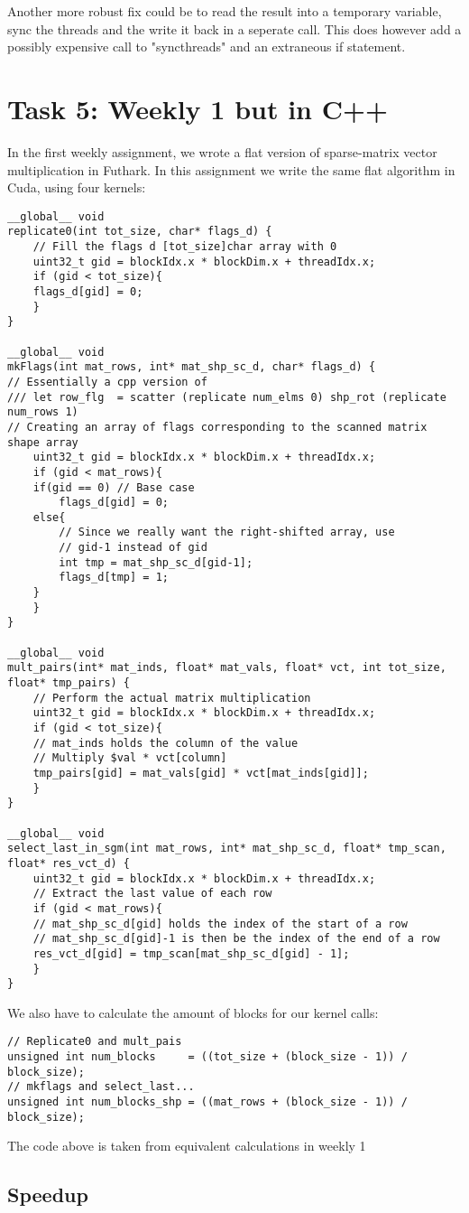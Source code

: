 \documentclass[11pt]{article}
\begin{document}
Another more robust fix could be to read the result into a temporary variable,
sync the threads and the write it back in a seperate call. This does
however add a possibly expensive call to "syncthreads" and an extraneous
if statement.

\section{Task 5: Weekly 1 but in C++}
\label{sec:org208e6fa}
In the first weekly assignment, we wrote a flat version of sparse-matrix
vector multiplication in Futhark. In this assignment we write the same
flat algorithm in Cuda, using four kernels: 
\begin{verbatim}
__global__ void
replicate0(int tot_size, char* flags_d) {
    // Fill the flags d [tot_size]char array with 0
    uint32_t gid = blockIdx.x * blockDim.x + threadIdx.x;
    if (gid < tot_size){
	flags_d[gid] = 0;
    }
}

__global__ void
mkFlags(int mat_rows, int* mat_shp_sc_d, char* flags_d) {
// Essentially a cpp version of
/// let row_flg  = scatter (replicate num_elms 0) shp_rot (replicate num_rows 1)
// Creating an array of flags corresponding to the scanned matrix shape array
    uint32_t gid = blockIdx.x * blockDim.x + threadIdx.x;
    if (gid < mat_rows){
	if(gid == 0) // Base case
	    flags_d[gid] = 0;
	else{
	    // Since we really want the right-shifted array, use 
	    // gid-1 instead of gid
	    int tmp = mat_shp_sc_d[gid-1];
	    flags_d[tmp] = 1;
	}
    }
}

__global__ void 
mult_pairs(int* mat_inds, float* mat_vals, float* vct, int tot_size, float* tmp_pairs) {
    // Perform the actual matrix multiplication
    uint32_t gid = blockIdx.x * blockDim.x + threadIdx.x;
    if (gid < tot_size){
	// mat_inds holds the column of the value
	// Multiply $val * vct[column]
	tmp_pairs[gid] = mat_vals[gid] * vct[mat_inds[gid]];
    }
}

__global__ void
select_last_in_sgm(int mat_rows, int* mat_shp_sc_d, float* tmp_scan, float* res_vct_d) {
    uint32_t gid = blockIdx.x * blockDim.x + threadIdx.x;
    // Extract the last value of each row
    if (gid < mat_rows){
	// mat_shp_sc_d[gid] holds the index of the start of a row
	// mat_shp_sc_d[gid]-1 is then be the index of the end of a row
	res_vct_d[gid] = tmp_scan[mat_shp_sc_d[gid] - 1];
    }
}
\end{verbatim}

We also have to calculate the amount of blocks for our kernel calls:
\begin{verbatim}
// Replicate0 and mult_pais
unsigned int num_blocks     = ((tot_size + (block_size - 1)) / block_size);
// mkflags and select_last...
unsigned int num_blocks_shp = ((mat_rows + (block_size - 1)) / block_size);  
\end{verbatim}
The code above is taken from equivalent calculations in weekly 1

\subsection{Speedup}
\label{sec:orge4539a2}
\end{document}
